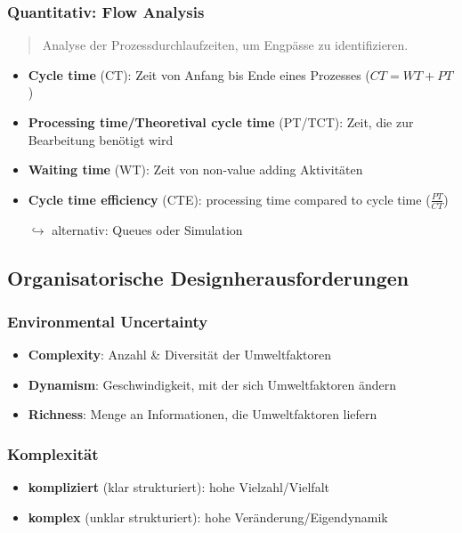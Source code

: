 \documentclass{article}
\begin{document}
\subsubsection{Quantitativ: Flow Analysis}
\begin{quote}Analyse der Prozessdurchlaufzeiten, um Engpässe zu identifizieren.\end{quote}
\begin{itemize}
  \item \textbf{Cycle time} (CT): Zeit von Anfang bis Ende eines Prozesses ($CT = WT + PT$)
  \item \textbf{Processing time/Theoretival cycle time} (PT/TCT): Zeit, die zur Bearbeitung benötigt wird
  \item \textbf{Waiting time} (WT): Zeit von non-value adding Aktivitäten
  \item \textbf{Cycle time efficiency} (CTE): processing time compared to cycle time ($\frac{PT}{CT}$)
  \item[$\hookrightarrow$] alternativ: Queues oder Simulation
\end{itemize}

\subsection{Organisatorische Designherausforderungen}
\subsubsection{Environmental Uncertainty}
\begin{itemize}
  \item \textbf{Complexity}: Anzahl \& Diversität der Umweltfaktoren
  \item \textbf{Dynamism}: Geschwindigkeit, mit der sich Umweltfaktoren ändern
  \item \textbf{Richness}: Menge an Informationen, die Umweltfaktoren liefern
\end{itemize}

\subsubsection{Komplexität}
\begin{itemize}
  \item \textbf{kompliziert} (klar strukturiert): hohe Vielzahl/Vielfalt
  \item \textbf{komplex} (unklar strukturiert): hohe Veränderung/Eigendynamik
\end{itemize}
\end{document}
